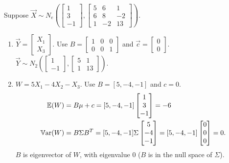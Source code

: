 \documentclass[10pt, a4paper]{article}
\begin{document}
\begin{example}
    Suppose $\vec{X} \sim N_e\left(\begin{bmatrix}
        1 \\ 3 \\ -1
    \end{bmatrix}, \begin{bmatrix}
        5 & 6 & 1 \\ 6 & 8 & -2 \\ 1 & -2 & 13
    \end{bmatrix}\right)$.

    \begin{enumerate}[label = (\alph*)]
        \item $\vec{Y} = \begin{bmatrix}
            X_1 \\ X_3
        \end{bmatrix}$.
        Use $B = \begin{bmatrix}
            1 & 0 & 0 \\ 0 & 0 & 1
        \end{bmatrix}$ and $\vec{c} = \begin{bmatrix}
            0 \\ 0
        \end{bmatrix}$.
        $\vec{Y} \sim N_2\left(\begin{bmatrix}
            1 \\ -1
        \end{bmatrix}, \begin{bmatrix}
            5 & 1 \\ 1 & 13
        \end{bmatrix}\right)$.

        \item $W = 5X_1 - 4X_2 - X_3$.
        Use $B = [5, -4, -1]$ and $c = 0$.
        \begin{align*}
            \mathbb{E}(W) &= B\mathbf{\mu} + c = [5, -4, -1]\begin{bmatrix}
                1 \\ 3 \\ -1
            \end{bmatrix} = -6 \\
            \mathbb{V}\mathrm{ar}(W) &= B\Sigma B ^ T = [5, -4, -1]\Sigma\begin{bmatrix}
                5 \\ -4 \\ -1
            \end{bmatrix} = [5, -4, -1]\begin{bmatrix}
                0 \\ 0 \\ 0
            \end{bmatrix} = 0.
        \end{align*}
        $B$ is eigenvector of $W$,
        with eigenvalue $0$
        ($B$ is in the null space of $\Sigma$).
    \end{enumerate}
\end{example}
\end{document}
